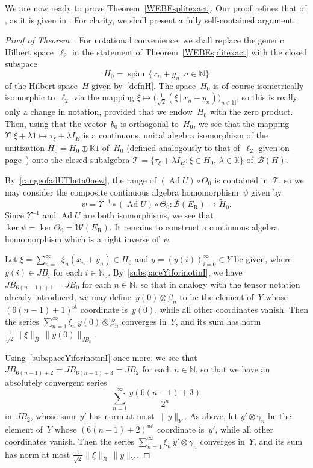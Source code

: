 \documentclass[12pt,reqno]{amsart}
\theoremstyle{definition}
\numberwithin{equation}{section}
\newcommand{\N}{\mathbb{N}}
\newcommand{\K}{\mathbb{K}}
\newcommand{\clspa}{\overline{\operatorname{span}}\,}
\newcommand{\ad}{\operatorname{Ad}}
\begin{document}
We are now ready to prove Theorem~\ref{WEBEsplitexact}. Our proof
refines that of \cite[Lemma~4.2]{read}, as it is given in
\cite[p.~320]{read}. For clarity, we shall present a fully
self-contained argument.

\begin{proof}[Proof of Theorem~{\normalfont{\ref{WEBEsplitexact}}}] 
For notational convenience, we shall replace the generic Hilbert
space~$\ell_2$ in the statement of Theorem~\ref{WEBEsplitexact}
with the closed subspace
\[ H_0 = \clspa\{x_n+y_n : n\in\N\} \] 
of the Hilbert space~$H$ given by~\eqref{defnH}.  The space~$H_0$ is
of course isometrically isomorphic to~$\ell_2$ via the mapping
$\xi\mapsto \bigl(\frac{1}{\sqrt{2}}(\xi\,|\,x_n+y_n)\bigr)_{n\in\N}$,
so this is really only a change in notation, provided that we
endow~$H_0$ with the zero product. Then, using that the vector~$b_0$ is
orthogonal to~$H_0$, we see that the mapping $\Upsilon\colon \xi
+\lambda1\mapsto\tau_\xi +\lambda I_H$ is a continuous, unital algebra
isomorphism of the unitization $\widetilde{H}_0 = H_0\oplus\K1$
of~$H_0$ (defined analogously to that of~$\ell_2$ given on
page~\pageref{WEBEsplitexact}) onto the closed subalgebra $\mathscr{T} =
\{\tau_\xi +\lambda I_H : \xi\in H_0,\, \lambda\in\K\}$
of~$\mathscr{B}(H)$.

By~\eqref{rangeofadUTheta0new}, the range of $(\ad U)\circ\Theta_0$ is
contained in~$\mathscr{T}$, so we may consider the composite
continuous algebra homomorphism~$\psi$ given by \[ \psi =
\Upsilon^{-1}\circ(\ad U)\circ\Theta_0\colon
\mathscr{B}(E_{\text{R}})\to\widetilde{H}_0. \] Since $\Upsilon^{-1}$
and $\ad U$ are both isomorphisms, we see that $\ker\psi =
\ker\Theta_0 = \mathscr{W}(E_{\text{R}})$. It remains to construct a
continuous algebra homomorphism which is a right inverse of~$\psi$.

Let $\xi = \sum_{n=1}^\infty\xi_n(x_n+y_n)\in H_0$ and $y =
(y(i))_{i=0}^\infty\in Y$ be given, where \mbox{$y(i)\in JB_i$} for
each $i\in\N_0$. By~\eqref{subspaceYiforinotinI}, we
have $JB_{6(n-1)+1} = JB_0$ for each $n\in\N$, so that in analogy with
the tensor notation already introduced, we may
define~$y(0)\otimes\beta_n$ to be the element of~$Y$ whose
$(6(n-1)+1)^{\text{st}}$ coordinate is~$y(0)$, while all other
co\-or\-di\-nates vanish. Then the series
$\sum_{n=1}^\infty\xi_n\,y(0)\otimes\beta_n$ converges in~$Y$, and its
sum has norm
$\frac{1}{\sqrt{2}}\|\xi\|_{\overline{B}}\,\|y(0)\|_{JB_0}$.

Using~\eqref{subspaceYiforinotinI} once more, we see that
$JB_{6(n-1)+2} = JB_{6(n-1)+3} = JB_2$ for each \mbox{$n\in\N$}, so
that we have an absolutely convergent series \[ \sum_{n=1}^\infty
\frac{y(6(n-1)+3)}{2^n} \] in~$JB_2$, whose sum~$y'$ has norm at
most~$\|y\|_Y$. As above, let $y'\otimes\gamma_n$ be the element
of~$Y$ whose \mbox{$(6(n-1)+2)^{\text{nd}}$} coordinate is~$y'$, while
all other co\-or\-di\-nates vanish. Then the series
$\sum_{n=1}^\infty\xi_n\, y'\otimes\gamma_n$ converges in~$Y$, and its
sum has norm at most
$\frac{1}{\sqrt{2}}\|\xi\|_{\overline{B}}\,\|y\|_Y$.


\end{proof}
\end{document}
